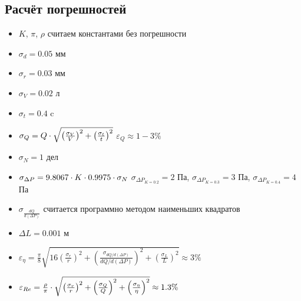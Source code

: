 	\subsection*{Расчёт погрешностей}
	\begin{itemize}
	\item $K$, $\pi$, $\rho$ считаем константами без погрешности
	\item $\sigma_{d} = 0.05$ мм
	\item $\sigma_{r} = 0.03$ мм
	\item $\sigma_{V} = 0.02$ л
	\item $\sigma_{t} = 0.4$ c
	\item $\sigma_{Q} = Q \cdot \sqrt{\left (\frac{\sigma_{V}}{V} \right )^2 + \left (\frac{\sigma_{t}}{t} \right )^2}$\n
	$\varepsilon_{Q} \approx 1-3 \%$
	\item $\sigma_{N} = 1$ дел
	\item $\sigma_{\Delta P} = 9.8067 \cdot K \cdot 0.9975 \cdot \sigma_{N}$\n
	$\sigma_{\Delta P_{K = 0.2}} = 2$ Па,
	$\sigma_{\Delta P_{K = 0.3}} = 3$ Па,
	$\sigma_{\Delta P_{K = 0.4}} = 4$ Па
	\item $\sigma_{\frac{dQ}{d(\Delta P)}}$ считается программно методом наименьших квадратов
	\item $\Delta L = 0.001$ м
	\item $\varepsilon_{\eta} = \frac{\pi}{8} \sqrt{16 \left ( \frac{\sigma_{r}}{r} \right )^2 + \left (\frac{\sigma_{dQ/d(\Delta P)}}{dQ/d(\Delta P)} \right )^2 + \left (\frac{\sigma_{L}}{L} \right )^2} \approx 3 \%$
	\item $\varepsilon_{Re} = \frac{\rho}{\pi} \cdot \sqrt{\left (\frac{\sigma_{r}}{r} \right )^2 + \left (\frac{\sigma_{Q}}{Q} \right )^2 + \left (\frac{\sigma_{\eta}}{\eta} \right )^2} \approx 1.3 \%$
	\end{itemize}
